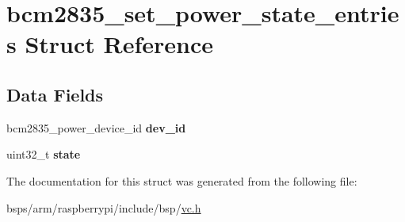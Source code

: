 \hypertarget{structbcm2835__set__power__state__entries}{}\section{bcm2835\+\_\+set\+\_\+power\+\_\+state\+\_\+entries Struct Reference}
\label{structbcm2835__set__power__state__entries}
\subsection*{Data Fields}
\begin{DoxyCompactItemize}
\item 
\mbox{\label{structbcm2835__set__power__state__entries_a22e0fc11faf172f9d46d3161a9e1d2d2}} 
bcm2835\+\_\+power\+\_\+device\+\_\+id {\bfseries dev\+\_\+id}
\item 
\mbox{\label{structbcm2835__set__power__state__entries_ae47c30c62a3db3e1967efa04b5b31955}} 
uint32\+\_\+t {\bfseries state}
\end{DoxyCompactItemize}


The documentation for this struct was generated from the following file\+:\begin{DoxyCompactItemize}
\item 
bsps/arm/raspberrypi/include/bsp/\mbox{\hyperlink{vc_8h}{vc.\+h}}\end{DoxyCompactItemize}
